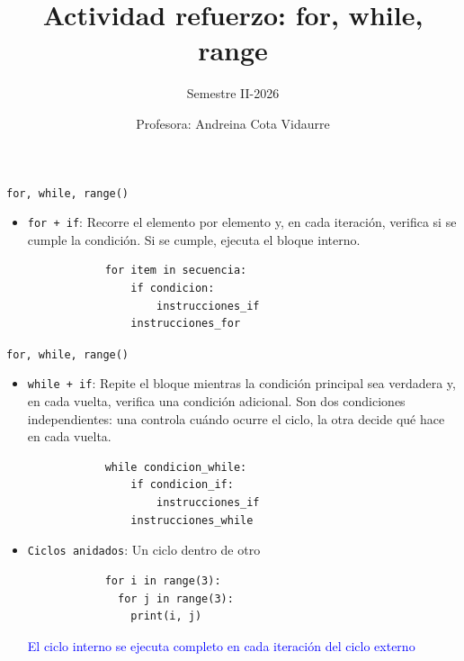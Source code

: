 \documentclass{beamer}
\title{Actividad refuerzo: for, while, range} %
\subtitle{Semestre II-2026} %
\author{Profesora: Andreina Cota Vidaurre}
\begin{document}
  \shorthandoff{-}
  \frame[c]{\maketitle}


    \begin{frame}[fragile, t]{\texttt{for, while, range()}}
        \begin{itemize}
            \item \texttt{for + if}: Recorre el elemento por elemento y, en cada iteración, verifica si se cumple la condición. Si se cumple, ejecuta el bloque interno.
            \begin{verbatim}
            for item in secuencia:
                if condicion:
                    instrucciones_if
                instrucciones_for
            \end{verbatim}
        \end{itemize}
    \end{frame}

    \begin{frame}[fragile, t]{\texttt{for, while, range()}}
        \begin{itemize}
            \item \texttt{while + if}: Repite el bloque mientras la condición principal sea verdadera y, en cada vuelta, verifica una condición adicional. Son dos condiciones independientes: una controla cuándo ocurre el ciclo, la otra decide qué hace en cada vuelta.
            \begin{verbatim}
            while condicion_while:
                if condicion_if:
                    instrucciones_if
                instrucciones_while
            \end{verbatim}
            \item \texttt{Ciclos anidados}: Un ciclo dentro de otro
            \begin{verbatim}
            for i in range(3):
              for j in range(3):
                print(i, j)
            \end{verbatim}
            \textcolor{blue}{El ciclo interno se ejecuta completo en cada iteración del ciclo externo}
        \end{itemize}
    \end{frame}
    
\end{document}
